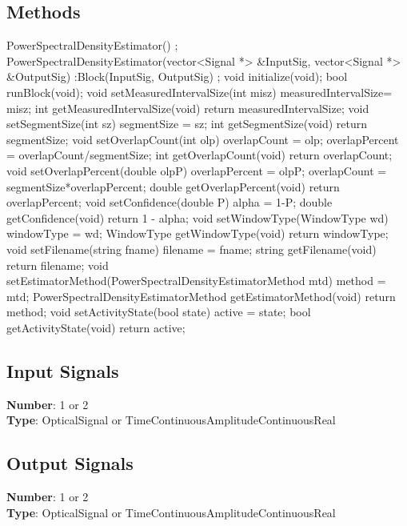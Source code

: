 \begin{refsection}
\subsection*{Methods}
	PowerSpectralDensityEstimator() {};
	\bigbreak
	PowerSpectralDensityEstimator(vector<Signal *> \&InputSig, vector<Signal *> \&OutputSig) :Block(InputSig, OutputSig) {};
	\bigbreak
	void initialize(void);
	\bigbreak
	bool runBlock(void);
	\bigbreak
	void setMeasuredIntervalSize(int misz) { measuredIntervalSize= misz; }
	\bigbreak
	int getMeasuredIntervalSize(void) { return measuredIntervalSize; }
	\bigbreak
	void setSegmentSize(int sz) { segmentSize = sz; }
	\bigbreak
	int getSegmentSize(void) { return segmentSize; }
	\bigbreak
	void setOverlapCount(int olp) { overlapCount = olp; overlapPercent =  overlapCount/segmentSize;}
	\bigbreak
	int getOverlapCount(void) { return overlapCount; }
	\bigbreak
	void setOverlapPercent(double olpP) { overlapPercent = olpP; overlapCount = segmentSize*overlapPercent;}
	\bigbreak
	double getOverlapPercent(void) { return overlapPercent; }
	\bigbreak
	void setConfidence(double P) { alpha = 1-P; }
	\bigbreak
	double getConfidence(void) { return 1 - alpha; }
	\bigbreak
	void setWindowType(WindowType wd) { windowType = wd; }
	\bigbreak
	WindowType getWindowType(void) { return windowType; }
	\bigbreak
	void setFilename(string fname) { filename = fname; }
	\bigbreak
	string getFilename(void) { return filename; }
	\bigbreak
	void setEstimatorMethod(PowerSpectralDensityEstimatorMethod mtd) { method = mtd; }
	\bigbreak
	PowerSpectralDensityEstimatorMethod getEstimatorMethod(void) { return method; }
	\bigbreak
	void setActivityState(bool state) { active = state; }
	\bigbreak
	bool getActivityState(void) { return active; }
	\bigbreak
\subsection*{Input Signals}

\textbf{Number}: 1 or 2\\
\textbf{Type}: OpticalSignal or TimeContinuousAmplitudeContinuousReal

\subsection*{Output Signals}

\textbf{Number}: 1 or 2\\
\textbf{Type}: OpticalSignal or TimeContinuousAmplitudeContinuousReal


\end{refsection}
